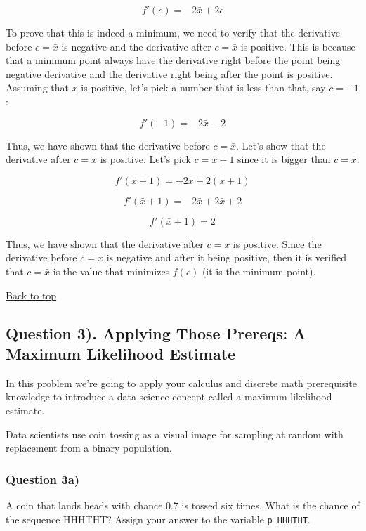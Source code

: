 \documentclass[11pt]{article}
\begin{document}
\[f'(c) = -2\bar{x} + 2c\]

To prove that this is indeed a minimum, we need to verify that the
derivative before \(c = \bar{x}\) is negative and the derivative after
\(c = \bar{x}\) is positive. This is because that a minimum point always
have the derivative right before the point being negative derivative and
the derivative right being after the point is positive. Assuming that
\(\bar{x}\) is positive, let's pick a number that is less than that, say
\(c = -1\):

\[f'(-1) = -2\bar{x} -2\]

Thus, we have shown that the derivative before \(c = \bar{x}\). Let's
show that the derivative after \(c = \bar{x}\) is positive. Let's pick
\(c = \bar{x} + 1\) since it is bigger than \(c = \bar{x}\):

\[f'(\bar{x} + 1) = -2\bar{x} +2(\bar{x} + 1)\]

\[f'(\bar{x} + 1) = -2\bar{x} + 2\bar{x} + 2\]

\[f'(\bar{x} + 1) =  2\]

Thus, we have shown that the derivative after \(c = \bar{x}\) is
positive. Since the derivative before \(c = \bar{x}\) is negative and
after it being positive, then it is verified that \(c = \bar{x}\) is the
value that minimizes \(f(c)\) (it is the minimum point).

    \hyperref[top]{Back to top}

\subsection{\texorpdfstring{ Question 3). Applying Those Prereqs: A
Maximum Likelihood
Estimate}{ Question 3). Applying Those Prereqs: A Maximum Likelihood Estimate}}\label{question-3.-applying-those-prereqs-a-maximum-likelihood-estimate}

    In this problem we're going to apply your calculus and discrete math
prerequisite knowledge to introduce a data science concept called a
maximum likelihood estimate.

Data scientists use coin tossing as a visual image for sampling at
random with replacement from a binary population.

\subsubsection{Question 3a)}\label{question-3a}

A coin that lands heads with chance 0.7 is tossed six times. What is the
chance of the sequence HHHTHT? Assign your answer to the variable
\texttt{p\_HHHTHT}.
\end{document}
